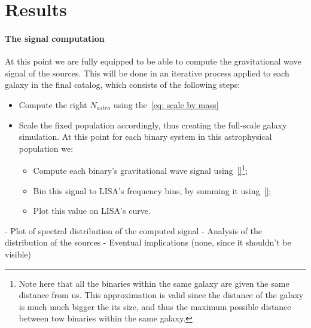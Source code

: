 \chapter{Results}
\subsubsection{The signal computation}
At this point we are fully equipped to be able to compute the gravitational wave signal of the sources.
This will be done in an iterative process applied to each galaxy in the final catalog, which consists of the following steps:
\begin{itemize}
    \item Compute the right $N_{astro}$ using the~\eqref{eq: scale by mass}
    \item Scale the fixed population accordingly, thus creating the full-scale galaxy simulation.
    At this point for each binary system in this astrophysical population we:
    \begin{itemize}
        \item Compute each binary's gravitational wave signal using~\eqref{}\footnote{Note here that all the binaries within the same galaxy are given the same distance from us. This approximation is valid since the distance of the galaxy is much much bigger the its size, and thus the maximum possible distance between tow binaries within the same galaxy.};
        \item Bin this signal to LISA's frequency bins, by summing it using~\eqref{};
        \item Plot this value on LISA's curve.
    \end{itemize}
\end{itemize}


- Plot of spectral distribution of the computed signal
- Analysis of the distribution of the sources
- Eventual implications (none, since it shouldn't be visible)
